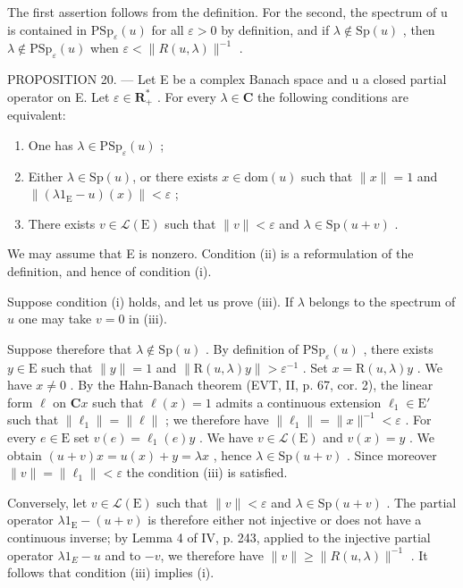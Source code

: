 The first assertion follows from the definition. For the second, the spectrum of u is contained in \(\mathrm{PSp}_{\varepsilon}(u)\) for all \(\varepsilon > 0\) by definition, and if \(\lambda \notin \mathrm{Sp}(u)\) , then \(\lambda \notin \mathrm{PSp}_{\varepsilon}(u)\) when \(\varepsilon < \|R(u, \lambda)\|^{-1}\) .

PROPOSITION 20. --- Let E be a complex Banach space and u a closed partial operator on E. Let \(\varepsilon\in\mathbf{R}_{+}^{*}\) . For every \(\lambda\in\mathbf{C}\) the following conditions are equivalent:

\begin{enumerate}
\def\labelenumi{(\roman{enumi})}
\item
  One has \(\lambda \in \mathrm{PSp}_{\varepsilon}(u)\) ;
\item
  Either \(\lambda \in \mathrm{Sp}(u)\), or there exists \(x \in \mathrm{dom}(u)\) such that \(\| x \| = 1\) and \(\| (\lambda 1_{\mathrm{E}} - u)(x) \| < \varepsilon\) ;
\item
  There exists \(v \in \mathcal{L}(\mathrm{E})\) such that \(\| v \| < \varepsilon\) and \(\lambda \in \mathrm{Sp}(u + v)\) .
\end{enumerate}

We may assume that E is nonzero. Condition (ii) is a reformulation of the definition, and hence of condition (i).

Suppose condition (i) holds, and let us prove (iii). If \(\lambda\) belongs to the spectrum of \(u\) one may take \(v = 0\) in (iii).

Suppose therefore that \(\lambda \notin \mathrm{Sp}(u)\) . By definition of \(\mathrm{PSp}_{\varepsilon}(u)\) , there exists \(y \in \mathrm{E}\) such that \(\| y \| = 1\) and \(\| \mathrm{R}(u, \lambda)y \| > \varepsilon^{-1}\) . Set \(x = \mathrm{R}(u, \lambda)y\) . We have \(x \neq 0\) . By the Hahn-Banach theorem (EVT, II, p. 67, cor. 2), the linear form \(\ell\) on \(\mathbf{C}x\) such that \(\ell(x) = 1\) admits a continuous extension \(\ell_1 \in \mathrm{E}'\) such that \(\| \ell_1 \| = \| \ell \|\) ; we therefore have \(\| \ell_1 \| = \| x \|^{-1} < \varepsilon\) . For every \(e \in \mathrm{E}\) set \(v(e) = \ell_1(e)y\) . We have \(v \in \mathcal{L}(\mathrm{E})\) and \(v(x) = y\) . We obtain \((u + v)x = u(x) + y = \lambda x\) , hence \(\lambda \in \mathrm{Sp}(u + v)\) . Since moreover \(\| v \| = \| \ell_1 \| < \varepsilon\) the condition (iii) is satisfied.

Conversely, let \(v \in \mathcal{L}(\mathrm{E})\) such that \(\|v\| < \varepsilon\) and \(\lambda \in \mathrm{Sp}(u + v)\) . The partial operator \(\lambda1_{\mathrm{E}} - (u + v)\) is therefore either not injective or does not have a continuous inverse; by Lemma 4 of IV, p. 243, applied to the injective partial operator \(\lambda1_{E} - u\) and to \(-v\), we therefore have \(\|v\| \geqslant \|R(u, \lambda)\|^{-1}\) . It follows that condition (iii) implies (i).

